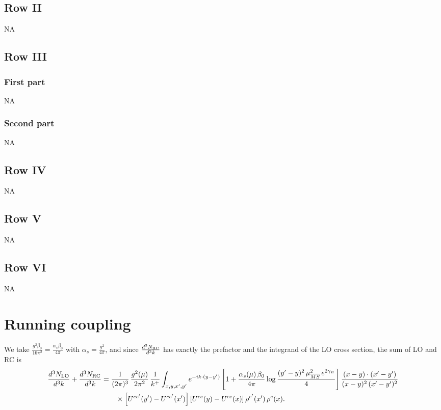 \documentclass[9pt]{article}
\numberwithin{equation}{section}
\begin{document}
\subsection{Row II}
\textsc{NA}
 \subsection{Row III}
\subsubsection{First part}
\textsc{NA}
\subsubsection{Second part}
\textsc{NA}
\subsection{Row IV}
\textsc{NA}
\subsection{Row V}
\textsc{NA}
\subsection{Row VI}
\textsc{NA}
\section{Running coupling}
We take $\frac{g^{2}\beta_{0}}{16\pi^{2}}=\frac{\alpha_{s}\beta_{0}}{4\pi}$ with $\alpha_{s}=\frac{g^{2}}{4\pi}$, and since $\frac{d^{3}N_{\rm RC}}{d^{3}k}$ has exactly the prefactor and the integrand of the LO cross section, the sum of LO and RC is
\begin{align}
\frac{d^{3}N_{\rm LO}}{d^{3}k}+\frac{d^{3}N_{\rm RC}}{d^{3}k}&=\frac{1}{(2\pi)^{3}}\,\frac{g^{2}(\mu)}{2\pi^{2}}\,\frac{1}{k^{+}}\int_{x,y,x',y'}e^{-ik\cdot(y-y')}\left[1+\frac{\alpha_{s}(\mu)\,\beta_{0}}{4\pi}\log\frac{(y'-y)^{2}\,\mu^{2}_{\overline{MS}}\,e^{2\gamma_{E}}}{4}\right]\frac{(x-y)\cdot(x'-y')}{(x-y)^{2}\,(x'-y')^{2}}\notag\\
&\qquad\times\left[U^{ce'}(y')-U^{ce'}(x')\right]\left[U^{ce}(y)-U^{ce}(x)\right]\rho^{e'}(x')\,\rho^{e}(x).
\end{align}
\end{document}
